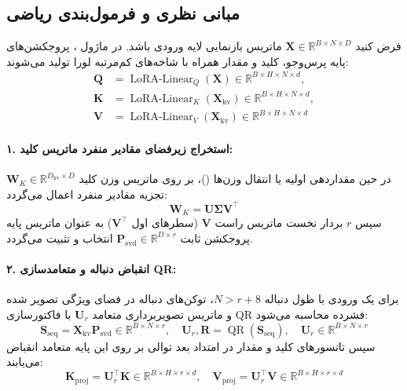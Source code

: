\subsection{مبانی نظری و فرمول‌بندی ریاضی}
فرض کنید $\mathbf{X} \in \mathbb{R}^{B \times N \times D}$ ماتریس بازنمایی لایه ورودی باشد. در ماژول ، پروجکشن‌های پایه پرس‌وجو، کلید و مقدار همراه با شاخه‌های کم‌مرتبه لورا تولید می‌شوند:
\begin{align}
\mathbf{Q} &= \operatorname{LoRA-Linear}_Q(\mathbf{X}) \in \mathbb{R}^{B \times H \times N \times d}, \\
\mathbf{K} &= \operatorname{LoRA-Linear}_K(\mathbf{X}_{\text{kv}}) \in \mathbb{R}^{B \times H \times N \times d}, \\
\mathbf{V} &= \operatorname{LoRA-Linear}_V(\mathbf{X}_{\text{kv}}) \in \mathbb{R}^{B \times H \times N \times d}
\end{align}

\paragraph{۱. استخراج زیرفضای مقادیر منفرد ماتریس کلید:}
در حین مقداردهی اولیه یا انتقال وزن‌ها ()، بر روی ماتریس وزن کلید $\mathbf{W}_K \in \mathbb{R}^{D_{\text{kv}} \times D}$ تجزیه مقادیر منفرد اعمال می‌گردد:
\begin{equation}
\mathbf{W}_K = \mathbf{U} \mathbf{\Sigma} \mathbf{V}^\top
\end{equation}
سپس $r$ بردار نخست ماتریس راست $\mathbf{V}$ (سطرهای اول $\mathbf{V}^\top$) به عنوان ماتریس پایه پروجکشن ثابت $\mathbf{P}_{\text{svd}} \in \mathbb{R}^{D \times r}$ انتخاب و تثبیت می‌گردد.

\paragraph{۲. انقباض دنباله و متعامدسازی QR:}
برای یک ورودی با طول دنباله $N > r + 8$، توکن‌های دنباله در فضای ویژگی تصویر شده و ماتریس تصویربرداری متعامد $\mathbf{U}_r$ با فاکتورسازی QR فشرده محاسبه می‌شود:
\begin{equation}
\mathbf{S}_{\text{seq}} = \mathbf{X}_{\text{kv}} \mathbf{P}_{\text{svd}} \in \mathbb{R}^{B \times N \times r}, \quad \mathbf{U}_r, \mathbf{R} = \operatorname{QR}(\mathbf{S}_{\text{seq}}), \quad \mathbf{U}_r \in \mathbb{R}^{B \times N \times r}
\end{equation}
سپس تانسورهای کلید و مقدار در امتداد بعد توالی بر روی این پایه متعامد انقباض می‌یابند:
\begin{equation}
\mathbf{K}_{\text{proj}} = \mathbf{U}_r^\top \mathbf{K} \in \mathbb{R}^{B \times H \times r \times d}, \quad \mathbf{V}_{\text{proj}} = \mathbf{U}_r^\top \mathbf{V} \in \mathbb{R}^{B \times H \times r \times d}
\end{equation}

